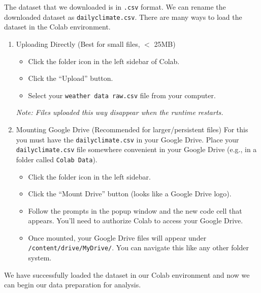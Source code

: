 The dataset that we downloaded is in \texttt{.csv} format. We can rename the downloaded dataset as \texttt{dailyclimate.csv}. There are many ways to load the dataset in the Colab environment.
\begin{enumerate}
\item {Uploading Directly (Best for small files, $<$ 25MB)}  
    \begin{itemize}
        \item Click the folder icon in the left sidebar of Colab.
        \item Click the ``Upload'' button.
        \item Select your \texttt{weather data raw.csv} file from your computer.
    \end{itemize}
\noindent \textit{Note: Files uploaded this way disappear when the runtime restarts.}

\item {Mounting Google Drive (Recommended for larger/persistent files)}  
For this you must have the \texttt{dailyclimate.csv} in your Google Drive. Place your \texttt{dailyclimate.csv} file somewhere convenient in your Google Drive (e.g., in a folder called \texttt{Colab Data}).

    \begin{itemize}
        \item Click the folder icon in the left sidebar.
        \item Click the ``Mount Drive'' button (looks like a Google Drive logo).
        \item Follow the prompts in the popup window and the new code cell that appears. You’ll need to authorize Colab to access your Google Drive.
        \item Once mounted, your Google Drive files will appear under \texttt{/content/drive/MyDrive/}. You can navigate this like any other folder system.
    \end{itemize}
\end{enumerate}
We have successfully loaded the dataset in our Colab environment and now we can begin our data preparation for analysis.



